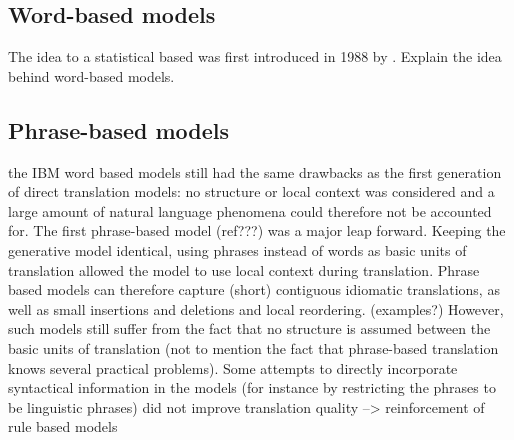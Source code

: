 \documentclass{report}
\theoremstyle{definition}
\theoremstyle{plain}
\begin{document}

\subsection{Word-based models}

The idea to a statistical based was first introduced in 1988 by \citeauthor{brown1988statistical}.
Explain the idea behind word-based models.

\subsection{Phrase-based models}

the IBM word based models still had the same drawbacks as the first generation of direct translation models: no structure or local context was considered and a large amount of natural language phenomena could therefore not be accounted for. The first phrase-based model (ref???) was a major leap forward. Keeping the generative model identical, using phrases instead of words as basic units of translation allowed the model to use local context during translation. Phrase based models can therefore capture (short) contiguous idiomatic translations, as well as small insertions and deletions and local reordering. (examples?) However, such models still suffer from the fact that no structure is assumed between the basic units of translation (not to mention the fact that phrase-based translation knows several practical problems). Some attempts to directly incorporate syntactical information in the models (for instance by restricting the phrases to be linguistic phrases) did not improve translation quality --> reinforcement of rule based models

\end{document}
